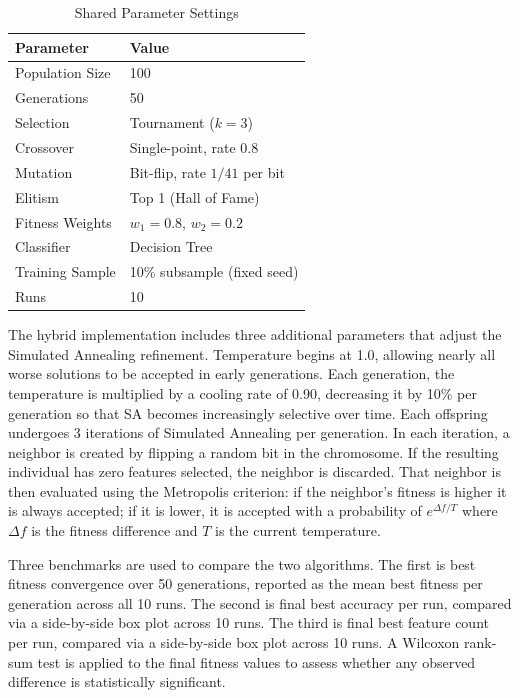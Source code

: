 \documentclass[letterpaper]{article} %
\begin{document}
\begin{table}[H]
\centering
\caption{Shared Parameter Settings}
\label{tab:params}
\begin{tabular}{ll}
\toprule
\textbf{Parameter} & \textbf{Value} \\
\midrule
Population Size     & 100 \\
Generations         & 50 \\
Selection           & Tournament ($k = 3$) \\
Crossover           & Single-point, rate 0.8 \\
Mutation            & Bit-flip, rate $1/41$ per bit \\
Elitism             & Top 1 (Hall of Fame) \\
Fitness Weights     & $w_1 = 0.8$, $w_2 = 0.2$ \\
Classifier          & Decision Tree \\
Training Sample     & 10\% subsample (fixed seed) \\
Runs                & 10 \\
\bottomrule
\end{tabular}
\end{table}

The hybrid implementation includes three additional parameters that adjust the Simulated Annealing refinement. Temperature begins at 1.0, allowing nearly all worse solutions to be accepted in early generations. Each generation, the temperature is multiplied by a cooling rate of 0.90, decreasing it by 10\% per generation so that SA becomes increasingly selective over time. Each offspring undergoes 3 iterations of Simulated Annealing per generation. In each iteration, a neighbor is created by flipping a random bit in the chromosome. If the resulting individual has zero features selected, the neighbor is discarded. That neighbor is then evaluated using the Metropolis criterion: if the neighbor's fitness is higher it is always accepted; if it is lower, it is accepted with a probability of $e^{\Delta f / T}$ where $\Delta f$ is the fitness difference and $T$ is the current temperature.

Three benchmarks are used to compare the two algorithms. The first is best fitness convergence over 50 generations, reported as the mean best fitness per generation across all 10 runs. The second is final best accuracy per run, compared via a side-by-side box plot across 10 runs. The third is final best feature count per run, compared via a side-by-side box plot across 10 runs. A Wilcoxon rank-sum test is applied to the final fitness values to assess whether any observed difference is statistically significant.
\end{document}
